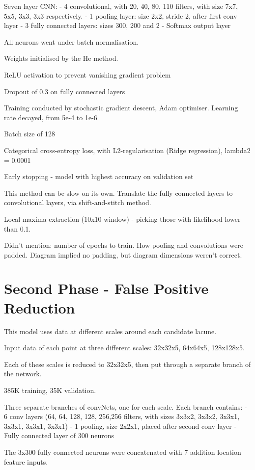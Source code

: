 \documentclass[honours,12pt]{unswthesis}
\numberwithin{equation}{section}
\begin{document}
Seven layer CNN:
- 4 convolutional, with 20, 40, 80, 110 filters, with size 7x7, 5x5, 3x3, 3x3 respectively.
- 1 pooling layer: size 2x2, stride 2, after first conv layer
- 3 fully connected layers: sizes 300, 200 and 2
- Softmax output layer

All neurons went under batch normalisation.

Weights initialised by the He method.

ReLU activation to prevent vanishing gradient problem

Dropout of 0.3 on fully connected layers

Training conducted by stochastic gradient descent, Adam optimiser. Learning rate decayed, from 5e-4 to 1e-6

Batch size of 128

Categorical cross-entropy loss, with L2-regularisation (Ridge regression), lambda2 = 0.0001

Early stopping - model with highest accuracy on validation set


This method can be slow on its own. Translate the fully connected layers to convolutional layers, via shift-and-stitch method.

Local maxima extraction (10x10 window) - picking those with likelihood lower than 0.1.


Didn't mention: number of epochs to train. How pooling and convolutions were padded. Diagram implied no padding, but diagram dimensions weren't correct. 

\section{Second Phase - False Positive Reduction}

This model uses data at different scales around each candidate lacune. 

Input data of each point at three different scales: 32x32x5, 64x64x5, 128x128x5.

Each of these scales is reduced to 32x32x5, then put through a separate branch of the network.

385K training, 35K validation.

Three separate branches of convNets, one for each scale. Each branch contains:
 - 6 conv layers (64, 64, 128, 128, 256,256 filters, with sizes 3x3x2, 3x3x2, 3x3x1, 3x3x1, 3x3x1, 3x3x1)
 - 1 pooling, size 2x2x1, placed after second conv layer
 - Fully connected layer of 300 neurons
 
 The 3x300 fully connected neurons were concatenated with 7 addition location feature inputs.
 
\end{document}
